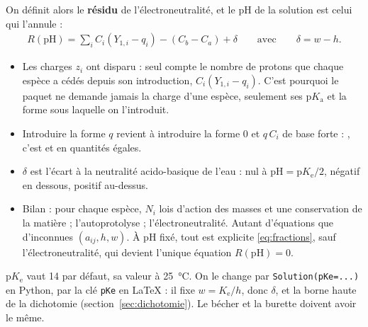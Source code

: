 \documentclass[a4paper,11pt]{article}
\newcommand\rmxcons[1]{\begin{tcolorbox}[rmq, rouge, left=3pt, fontupper=\small\itshape]\begin{itemize}[label=\ding{43}, leftmargin=*, topsep=0pt, itemsep=2pt]#1\end{itemize}\end{tcolorbox}}
\newcommand\gras[1]{\textbf{#1}}
\newcommand\rsltm[1]{\boxed{#1}}
\newcommand\pH{\ensuremath{\mathrm{pH}}\xspace}
\newcommand\pKa{\ensuremath{\mathrm{p}K_\mathrm{a}}\xspace}
\newcommand\pKe{\ensuremath{\mathrm{p}K_\mathrm{e}}\xspace}
\newcommand\Ke{\ensuremath{K_\mathrm{e}}\xspace}
\newcommand\pare[1]{\left(#1\right)}
\newcommand\code[1]{\texttt{#1}}
\begin{document}
On définit alors le \gras{résidu} de l'électroneutralité, et le \pH de la solution est celui qui l'annule :
\begin{align}
\rsltm{R(\pH)=\sum_iC_i\pare{Y_{1,i}-q_i}-\pare{C_b-C_a}+\delta}
\qquad\text{avec}\qquad\delta=w-h.
\label{eq:R}
\end{align}
\rmxcons{
\item Les charges $z_i$ ont disparu : seul compte le nombre de protons que chaque espèce a cédés depuis son introduction, $C_i\pare{Y_{1,i}-q_i}$.
C'est pourquoi le paquet ne demande jamais la charge d'une espèce, seulement ses \pKa et la forme sous laquelle on l'introduit.
\item Introduire la forme $q$ revient à introduire la forme 0 et $q\,C_i$ de base forte : \ce{NaHCO3}, c'est \ce{H2CO3} et \ce{NaOH} en quantités égales.
\item $\delta$ est l'écart à la neutralité acido-basique de l'eau : nul à $\pH=\pKe/2$, négatif en dessous, positif au-dessus.
\item Bilan : pour chaque espèce, $N_i$ lois d'action des masses et une conservation de la matière ; l'autoprotolyse ; l'électroneutralité.
Autant d'équations que d'inconnues $(a_{ij},h,w)$.
À \pH fixé, tout est explicite \eqref{eq:fractions}, sauf l'électroneutralité, qui devient l'unique équation $R(\pH)=0$.
}
\begin{option}
\pKe vaut 14 par défaut, sa valeur à \qty{25}{\degreeCelsius}.
On le change par \code{Solution(pKe=...)} en Python, par la clé \code{pKe} en \LaTeX{} : il fixe $w=\Ke/h$, donc $\delta$, et la borne haute de la dichotomie (section~\ref{sec:dichotomie}).
Le bécher et la burette doivent avoir le même.
\end{option}
\end{document}

